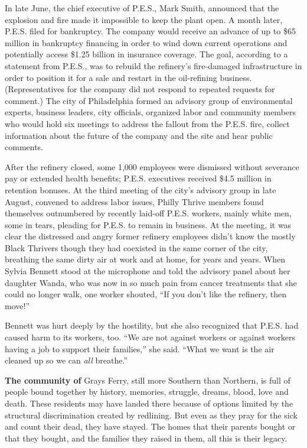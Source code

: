 In late June, the chief executive of P.E.S., Mark Smith, announced that
the explosion and fire made it impossible to keep the plant open. A
month later, P.E.S. filed for bankruptcy. The company would receive an
advance of up to \$65 million in bankruptcy financing in order to wind
down current operations and potentially access \$1.25 billion in
insurance coverage. The goal, according to a statement from P.E.S., was
to rebuild the refinery's fire-damaged infrastructure in order to
position it for a sale and restart in the oil-refining business.
(Representatives for the company did not respond to repeated requests
for comment.) The city of Philadelphia formed an advisory group of
environmental experts, business leaders, city officials, organized labor
and community members who would hold six meetings to address the fallout
from the P.E.S. fire, collect information about the future of the
company and the site and hear public comments.

After the refinery closed, some 1,000 employees were dismissed without
severance pay or extended health benefits; P.E.S. executives received
\$4.5 million in retention bonuses. At the third meeting of the city's
advisory group in late August, convened to address labor issues, Philly
Thrive members found themselves outnumbered by recently laid-off P.E.S.
workers, mainly white men, some in tears, pleading for P.E.S. to remain
in business. At the meeting, it was clear the distressed and angry
former refinery employees didn't know the mostly Black Thrivers though
they had coexisted in the same corner of the city, breathing the same
dirty air at work and at home, for years and years. When Sylvia Bennett
stood at the microphone and told the advisory panel about her daughter
Wanda, who was now in so much pain from cancer treatments that she could
no longer walk, one worker shouted, ``If you don't like the refinery,
then move!''

Bennett was hurt deeply by the hostility, but she also recognized that
P.E.S. had caused harm to its workers, too. ``We are not against workers
or against workers having a job to support their families,'' she said.
``What we want is the air cleaned up so we can \emph{all} breathe.''

\textbf{The community of} Grays Ferry, still more Southern than
Northern, is full of people bound together by history, memories,
struggle, dreams, blood, love and death. These residents may have landed
there because of options limited by the structural discrimination
created by redlining. But even as they pray for the sick and count their
dead, they have stayed. The homes that their parents bought or that they
bought, and the families they raised in them, all this is their legacy.

